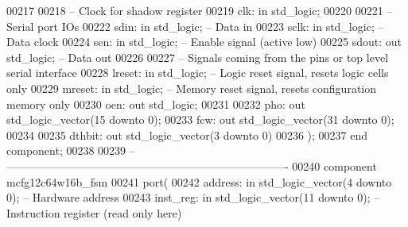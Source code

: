 \begin{DoxyCode}
00217         
00218 \textcolor{keyword}{        -- Clock for shadow register}
00219         clk: \textcolor{keywordflow}{in} \textcolor{comment}{std\_logic};
00220     
00221 \textcolor{keyword}{        -- Serial port IOs}
00222         sdin: \textcolor{keywordflow}{in} \textcolor{comment}{std\_logic};     \textcolor{keyword}{-- Data in}
00223         sclk: \textcolor{keywordflow}{in} \textcolor{comment}{std\_logic};     \textcolor{keyword}{-- Data clock}
00224         sen: \textcolor{keywordflow}{in} \textcolor{comment}{std\_logic};  \textcolor{keyword}{-- Enable signal (active low)}
00225         sdout: \textcolor{keywordflow}{out} \textcolor{comment}{std\_logic};   \textcolor{keyword}{-- Data out}
00226     
00227 \textcolor{keyword}{        -- Signals coming from the pins or top level serial interface}
00228         lreset: \textcolor{keywordflow}{in} \textcolor{comment}{std\_logic};   \textcolor{keyword}{-- Logic reset signal, resets logic cells only}
00229         mreset: \textcolor{keywordflow}{in} \textcolor{comment}{std\_logic};   \textcolor{keyword}{-- Memory reset signal, resets configuration memory only}
00230         oen: \textcolor{keywordflow}{out} \textcolor{comment}{std\_logic};
00231         
00232         pho: \textcolor{keywordflow}{out} \textcolor{comment}{std\_logic\_vector}(\textcolor{vhdllogic}{}\textcolor{vhdllogic}{15} \textcolor{keywordflow}{downto} \textcolor{vhdllogic}{}\textcolor{vhdllogic}{0});
00233         fcw: \textcolor{keywordflow}{out} \textcolor{comment}{std\_logic\_vector}(\textcolor{vhdllogic}{}\textcolor{vhdllogic}{31} \textcolor{keywordflow}{downto} \textcolor{vhdllogic}{}\textcolor{vhdllogic}{0});
00234         
00235         dthbit: \textcolor{keywordflow}{out} \textcolor{comment}{std\_logic\_vector}(\textcolor{vhdllogic}{}\textcolor{vhdllogic}{3} \textcolor{keywordflow}{downto} \textcolor{vhdllogic}{}\textcolor{vhdllogic}{0})
00236     );
00237 \textcolor{keywordflow}{end} \textcolor{keywordflow}{component};
00238 
00239 \textcolor{keyword}{-- ----------------------------------------------------------------------------}
00240 \textcolor{keywordflow}{component} mcfg12c64w16b\_fsm
00241     \textcolor{keywordflow}{port}(
00242         address: \textcolor{keywordflow}{in} \textcolor{comment}{std\_logic\_vector}(\textcolor{vhdllogic}{}\textcolor{vhdllogic}{4} \textcolor{keywordflow}{downto} \textcolor{vhdllogic}{}\textcolor{vhdllogic}{0});   \textcolor{keyword}{-- Hardware address}
00243         inst\_reg: \textcolor{keywordflow}{in} \textcolor{comment}{std\_logic\_vector}(\textcolor{vhdllogic}{}\textcolor{vhdllogic}{11} \textcolor{keywordflow}{downto} \textcolor{vhdllogic}{}\textcolor{vhdllogic}{0}); \textcolor{keyword}{-- Instruction register (read only here)}

\end{DoxyCode}
